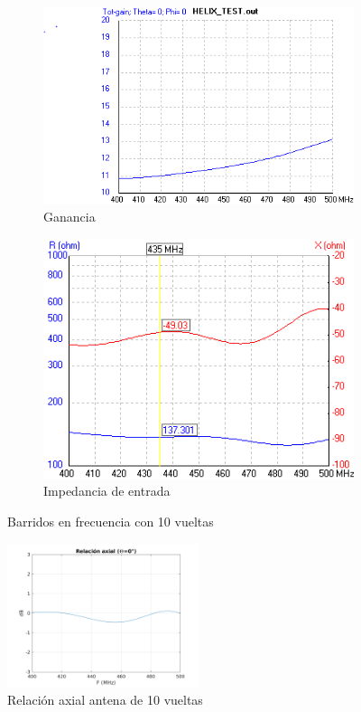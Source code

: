 \documentclass[12pt]{article}
\begin{document}
\begin{figure}[H]
	\centering
	\begin{subfigure}{.45\textwidth}
		\centering
		\includegraphics[width=1.1\linewidth]{helix_10_sweep_gain.png}
		\caption{Ganancia}
	\end{subfigure}%
	\begin{subfigure}{.45\textwidth}
		\centering
		\includegraphics[width=0.9\linewidth]{helix_10_sweep_zin.png}
		\caption{Impedancia de entrada}
	\end{subfigure}
	\caption{Barridos en frecuencia con 10 vueltas}
\end{figure}


\begin{figure}[H]
	\centering
	\includegraphics[width=0.5\textwidth]{helix_10_sweep_AR.png}
	\caption{Relación axial antena de 10 vueltas}
\end{figure}
\end{document}
